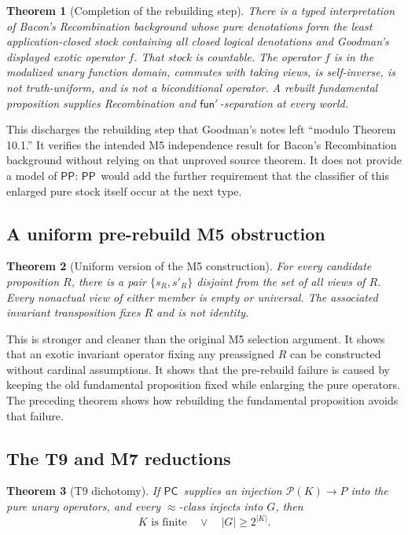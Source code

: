 \documentclass[12pt,leqno]{article}
\newcommand{\OR}{\ensuremath{\vee}}
\theoremstyle{plain}
\newtheorem{theorem}{Theorem}
\theoremstyle{definition}
\newcommand{\funp}{\ensuremath{\mathsf{fun}'\,}}
\newcommand{\PP}{\ensuremath{\mathsf{PP}}}
\newcommand{\PC}{\ensuremath{\mathsf{PC}}}
\newcommand{\Pow}{\ensuremath{\mathcal{P}}}
\begin{document}
\begin{theorem}[Completion of the rebuilding step]
There is a typed interpretation of Bacon's Recombination background whose
pure denotations form the least application-closed stock containing all
closed logical denotations and Goodman's displayed exotic operator \(f\).
That stock is countable.  The operator \(f\) is in the modalized unary
function domain, commutes with taking views, is self-inverse, is not
truth-uniform, and is not a biconditional operator.  A rebuilt fundamental
proposition supplies Recombination and \(\funp\)-separation at every world.
\end{theorem}

\noindent
This discharges the rebuilding step that Goodman's notes left ``modulo
Theorem 10.1.''  It verifies the intended M5 independence result for Bacon's
Recombination background without relying on that unproved source theorem.
It does not provide a model of \PP: \PP\ would
add the further requirement that the classifier of this enlarged pure stock
itself occur at the next type.

\subsection{A uniform pre-rebuild M5 obstruction}

\begin{theorem}[Uniform version of the M5 construction]
For every candidate proposition \(R\), there is a pair
\(\{s_R,s'_R\}\) disjoint from the set of all views of \(R\).  Every
nonactual view of either member is empty or universal.  The associated invariant
transposition fixes \(R\) and is not identity.
\end{theorem}

\noindent
This is stronger and cleaner than the original M5 selection argument.  It
shows that an exotic invariant operator fixing any preassigned \(R\) can be
constructed without cardinal assumptions.  It shows that the pre-rebuild
failure is caused by keeping the old fundamental proposition fixed while
enlarging the pure operators.  The preceding theorem shows how rebuilding
the fundamental proposition avoids that failure.

\subsection{The T9 and M7 reductions}

\begin{theorem}[T9 dichotomy]
If \PC\ supplies an injection \(\Pow(K)\to P\) into the pure unary operators,
and every \(\approx\)-class injects into \(G\), then
\[
 K\text{ is finite}
 \quad\OR\quad
 |G|\geq 2^{|K|}.
\]
\end{theorem}
\end{document}
